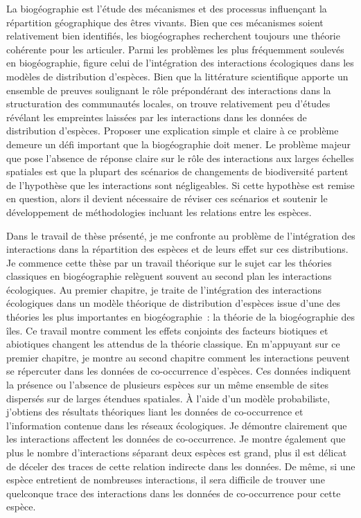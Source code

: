 La biogéographie est l'étude des mécanismes et des processus influençant
la répartition géographique des êtres vivants. Bien que ces mécanismes
soient relativement bien identifiés, les biogéographes recherchent
toujours une théorie cohérente pour les articuler. Parmi les problèmes
les plus fréquemment soulevés en biogéographie, figure celui de
l'intégration des interactions écologiques dans les modèles de
distribution d'espèces. Bien que la littérature scientifique apporte un
ensemble de preuves soulignant le rôle prépondérant des interactions
dans la structuration des communautés locales, on trouve relativement
peu d'études révélant les empreintes laissées par les interactions dans
les données de distribution d'espèces. Proposer une explication simple
et claire à ce problème demeure un défi important que la biogéographie
doit mener. Le problème majeur que pose l'absence de réponse claire sur
le rôle des interactions aux larges échelles spatiales est que la
plupart des scénarios de changements de biodiversité partent de
l'hypothèse que les interactions sont négligeables. Si cette hypothèse
est remise en question, alors il devient nécessaire de réviser ces
scénarios et soutenir le développement de méthodologies incluant les
relations entre les espèces.

Dans le travail de thèse présenté, je me confronte au problème de
l'intégration des interactions dans la répartition des espèces et de
leurs effet sur ces distributions. Je commence cette thèse par un
travail théorique sur le sujet car les théories classiques en
biogéographie relèguent souvent au second plan les interactions
écologiques. Au premier chapitre, je traite de l'intégration des
interactions écologiques dans un modèle théorique de distribution
d'espèces issue d'une des théories les plus importantes en
biogéographie~: la théorie de la biogéographie des îles. Ce travail
montre comment les effets conjoints des facteurs biotiques et abiotiques
changent les attendus de la théorie classique. En m'appuyant sur ce
premier chapitre, je montre au second chapitre comment les interactions
peuvent se répercuter dans les données de co-occurrence d'espèces. Ces
données indiquent la présence ou l'absence de plusieurs espèces sur un
même ensemble de sites dispersés sur de larges étendues spatiales. À
l'aide d'un modèle probabiliste, j'obtiens des résultats théoriques
liant les données de co-occurrence et l'information contenue dans les
réseaux écologiques. Je démontre clairement que les interactions
affectent les données de co-occurrence. Je montre également que plus le
nombre d'interactions séparant deux espèces est grand, plus il est
délicat de déceler des traces de cette relation indirecte dans les
données. De même, si une espèce entretient de nombreuses interactions,
il sera difficile de trouver une quelconque trace des interactions dans
les données de co-occurrence pour cette espèce.

